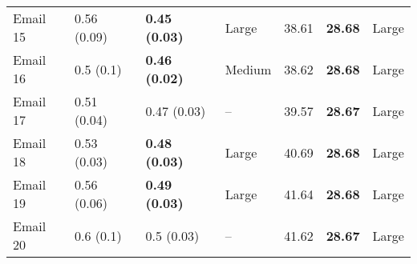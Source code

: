 \begin{tabular}{lllllll}
 Email 15 &       0.56 (0.09) &  \textbf{0.45 (0.03)} &       Large &                   38.61 &           \textbf{28.68} &       Large \\
 Email 16 &         0.5 (0.1) &  \textbf{0.46 (0.02)} &      Medium &                   38.62 &           \textbf{28.68} &       Large \\
 Email 17 &       0.51 (0.04) &           0.47 (0.03) &          -- &                   39.57 &           \textbf{28.67} &       Large \\
 Email 18 &       0.53 (0.03) &  \textbf{0.48 (0.03)} &       Large &                   40.69 &           \textbf{28.68} &       Large \\
 Email 19 &       0.56 (0.06) &  \textbf{0.49 (0.03)} &       Large &                   41.64 &           \textbf{28.68} &       Large \\
 Email 20 &         0.6 (0.1) &            0.5 (0.03) &          -- &                   41.62 &           \textbf{28.67} &       Large \\
\bottomrule
\end{tabular}
